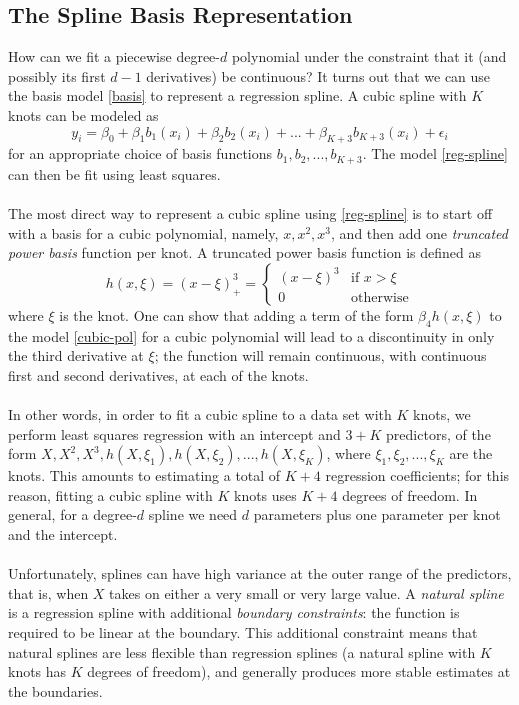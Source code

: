 \subsection{The Spline Basis Representation}
How can we fit a piecewise degree-$d$ polynomial under the constraint that it (and possibly its first $d - 1$ derivatives) be continuous? It turns out that we can use the basis model \ref{basis} to represent a regression spline. A cubic spline with $K$ knots can be modeled as
\begin{equation}
    y_i = \beta_0 + \beta_1b_1(x_i) + \beta_2b_2(x_i) + ... + \beta_{K+3}b_{K+3}(x_i) + \epsilon_i
    \label{reg-spline}
\end{equation}
for an appropriate choice of basis functions $b_1, b_2,...,b_{K+3}$. The model \ref{reg-spline} can then be fit using least squares.\\\\
The most direct way to represent a cubic spline using \ref{reg-spline} is to start off with a basis for a cubic polynomial, namely, $x, x^2, x^3$, and then add one \textit{truncated power basis} function per knot. A truncated power basis function is defined as 
\begin{equation}
    h(x, \xi) = (x - \xi)^3_+ = 
    \begin{cases}
        (x - \xi)^3 & \text{if } x > \xi\\
        0 & \text{otherwise}
    \end{cases}
\end{equation}
where $\xi$ is the knot. One can show that adding a term of the form $\beta_4h(x, \xi)$ to the model \ref{cubic-pol} for a cubic polynomial will lead to a discontinuity in only the third derivative at $\xi$; the function will remain continuous, with continuous first and second derivatives, at each of the knots.\\\\
In other words, in order to fit a cubic spline to a data set with $K$ knots, we
perform least squares regression with an intercept and $3 + K$ predictors, of the form $X, X^2, X^3, h(X, \xi_1), h(X, \xi_2), ..., h(X, \xi_K)$, where $\xi_1, \xi_2, ..., \xi_K$ are the knots. This amounts to estimating a total of $K + 4$ regression coefficients;  for this reason, fitting a cubic spline with $K$ knots uses $K+4$ degrees of freedom. In general, for a degree-$d$ spline we need $d$ parameters plus one parameter per knot and the intercept.\\\\
Unfortunately, splines can have high variance at the outer range of the predictors, that is, when $X$ takes on either a very small or very large value. A \textit{natural spline} is a regression spline with additional \textit{boundary constraints}: the function is required to be linear at the boundary. This additional constraint means that natural splines are less flexible than regression splines (a natural spline with $K$ knots has $K$ degrees of freedom), and generally produces more stable estimates at the boundaries.

